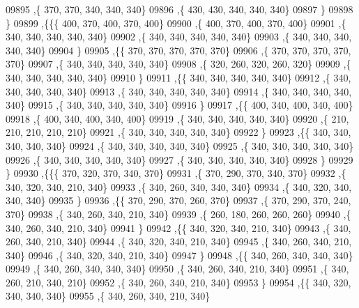 \begin{DoxyCode}
09895     ,\{   370,   370,   340,   340,   340\}
09896     ,\{   430,   430,   340,   340,   340\}
09897     \}
09898    \}
09899   ,\{\{\{   400,   370,   400,   370,   400\}
09900     ,\{   400,   370,   400,   370,   400\}
09901     ,\{   340,   340,   340,   340,   340\}
09902     ,\{   340,   340,   340,   340,   340\}
09903     ,\{   340,   340,   340,   340,   340\}
09904     \}
09905    ,\{\{   370,   370,   370,   370,   370\}
09906     ,\{   370,   370,   370,   370,   370\}
09907     ,\{   340,   340,   340,   340,   340\}
09908     ,\{   320,   260,   320,   260,   320\}
09909     ,\{   340,   340,   340,   340,   340\}
09910     \}
09911    ,\{\{   340,   340,   340,   340,   340\}
09912     ,\{   340,   340,   340,   340,   340\}
09913     ,\{   340,   340,   340,   340,   340\}
09914     ,\{   340,   340,   340,   340,   340\}
09915     ,\{   340,   340,   340,   340,   340\}
09916     \}
09917    ,\{\{   400,   340,   400,   340,   400\}
09918     ,\{   400,   340,   400,   340,   400\}
09919     ,\{   340,   340,   340,   340,   340\}
09920     ,\{   210,   210,   210,   210,   210\}
09921     ,\{   340,   340,   340,   340,   340\}
09922     \}
09923    ,\{\{   340,   340,   340,   340,   340\}
09924     ,\{   340,   340,   340,   340,   340\}
09925     ,\{   340,   340,   340,   340,   340\}
09926     ,\{   340,   340,   340,   340,   340\}
09927     ,\{   340,   340,   340,   340,   340\}
09928     \}
09929    \}
09930   ,\{\{\{   370,   320,   370,   340,   370\}
09931     ,\{   370,   290,   370,   340,   370\}
09932     ,\{   340,   320,   340,   210,   340\}
09933     ,\{   340,   260,   340,   340,   340\}
09934     ,\{   340,   320,   340,   340,   340\}
09935     \}
09936    ,\{\{   370,   290,   370,   260,   370\}
09937     ,\{   370,   290,   370,   240,   370\}
09938     ,\{   340,   260,   340,   210,   340\}
09939     ,\{   260,   180,   260,   260,   260\}
09940     ,\{   340,   260,   340,   210,   340\}
09941     \}
09942    ,\{\{   340,   320,   340,   210,   340\}
09943     ,\{   340,   260,   340,   210,   340\}
09944     ,\{   340,   320,   340,   210,   340\}
09945     ,\{   340,   260,   340,   210,   340\}
09946     ,\{   340,   320,   340,   210,   340\}
09947     \}
09948    ,\{\{   340,   260,   340,   340,   340\}
09949     ,\{   340,   260,   340,   340,   340\}
09950     ,\{   340,   260,   340,   210,   340\}
09951     ,\{   340,   260,   210,   340,   210\}
09952     ,\{   340,   260,   340,   210,   340\}
09953     \}
09954    ,\{\{   340,   320,   340,   340,   340\}
09955     ,\{   340,   260,   340,   210,   340\}

\end{DoxyCode}
